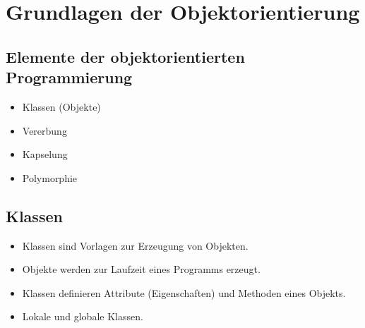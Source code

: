 \section{Grundlagen der Objektorientierung}

\subsection{Elemente der objektorientierten Programmierung}
\begin{itemize}
    \item Klassen (Objekte)
    \item Vererbung
    \item Kapselung
    \item Polymorphie
\end{itemize}

\subsection{Klassen}
\begin{itemize}
    \item Klassen sind Vorlagen zur Erzeugung von Objekten.
    \item Objekte werden zur Laufzeit eines Programms erzeugt.
    \item Klassen definieren Attribute (Eigenschaften) und Methoden eines Objekts.
    \item Lokale und globale Klassen. %
\end{itemize}